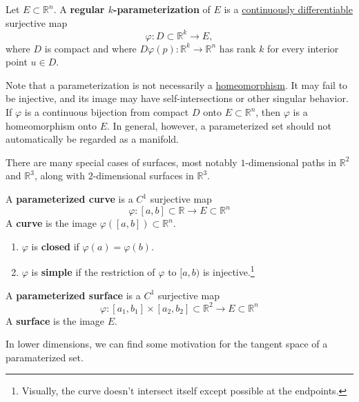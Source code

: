 	\begin{definition}
	  \label{def:regular-parameterization}
		Let $E \subset \mathbb{R}^n$. A \textbf{regular $k$-parameterization} of $E$ is a \hyperref[def:continuously-differentiable]{continuously differentiable} surjective map
		\begin{equation}
			\varphi : D \subset \mathbb{R}^k \to E,
		\end{equation}
		where $D$ is compact and where $D\varphi(p) : \mathbb{R}^k \to \mathbb{R}^n$ has rank $k$ for every interior point $u \in D$.
	\end{definition}
			
	Note that a parameterization is not necessarily a \hyperref[pst-def:homeomorphism]{homeomorphism}. It may fail to be injective, and its image may have self-intersections or other singular behavior. If $\varphi$ is a continuous bijection from compact $D$ onto $E \subset \mathbb{R}^n$, then $\varphi$ is a homeomorphism onto $E$. In general, however, a parameterized set should not automatically be regarded as a manifold.
			
	There are many special cases of surfaces, most notably $1$-dimensional paths in $\mathbb{R}^2$ and $\mathbb{R}^3$, along with $2$-dimensional surfaces in $\mathbb{R}^3$. 
			
	\begin{definition}[Curve]
	  \label{def:curve}
	  A \textbf{parameterized curve} is a $C^1$ surjective map 
		\begin{equation}
			\varphi: [a, b] \subset \mathbb{R} \to E \subset \mathbb{R}^n
		\end{equation} 
		A \textbf{curve} is the image $\varphi([a, b]) \subset \mathbb{R}^n$. 
			
		\begin{enumerate}
			\item $\varphi$ is \textbf{closed} if $\varphi(a) = \varphi(b)$. 
			\item $\varphi$ is \textbf{simple} if the restriction of $\varphi$ to $[a, b)$ is injective.\footnote{Visually, the curve doesn't intersect itself except possible at the endpoints.}
		\end{enumerate}
	\end{definition}
			
	\begin{definition}[Surface]
	  \label{def:surface}
	  A \textbf{parameterized surface} is a $C^1$ surjective map 
		\begin{equation}
			\varphi: [a_1, b_1] \times [a_2, b_2] \subset \mathbb{R}^2 \to E \subset \mathbb{R}^n
		\end{equation}
		A \textbf{surface} is the image $E$. 
	\end{definition}
	In lower dimensions, we can find some motivation for the tangent space of a paramaterized set. 
			
